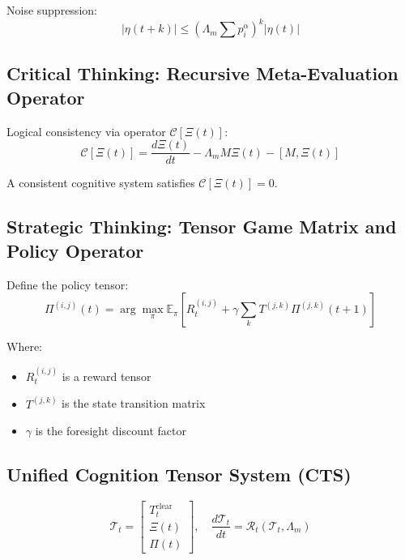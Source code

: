 \documentclass[12pt]{article}
\begin{document}
Noise suppression:
\begin{equation}
|\eta(t+k)| \leq \left( \Lambda_m \sum p_i^\alpha \right)^k |\eta(t)|
\end{equation}

\subsection{Critical Thinking: Recursive Meta-Evaluation Operator}

Logical consistency via operator $\mathcal{C}[\Xi(t)]$:
\begin{equation}
\mathcal{C}[\Xi(t)] = \frac{d\Xi(t)}{dt} - \Lambda_m M \Xi(t) - [M, \Xi(t)]
\end{equation}

A consistent cognitive system satisfies $\mathcal{C}[\Xi(t)] = 0$.

\subsection{Strategic Thinking: Tensor Game Matrix and Policy Operator}

Define the policy tensor:
\begin{equation}
\Pi^{(i,j)}(t) = \arg\max_{\pi} \mathbb{E}_{\pi} \left[ R_t^{(i,j)} + \gamma \sum_k T^{(j,k)} \Pi^{(j,k)}(t+1) \right]
\end{equation}

Where:
\begin{itemize}
  \item $R_t^{(i,j)}$ is a reward tensor
  \item $T^{(j,k)}$ is the state transition matrix
  \item $\gamma$ is the foresight discount factor
\end{itemize}

\subsection{Unified Cognition Tensor System (CTS)}

\begin{equation}
\mathcal{T}_t = \left[ \begin{array}{c}
T_t^{\text{clear}} \\
\Xi(t) \\
\Pi(t)
\end{array} \right], \quad \frac{d\mathcal{T}_t}{dt} = \mathcal{R}_t(\mathcal{T}_t, \Lambda_m)
\end{equation}
\end{document}
